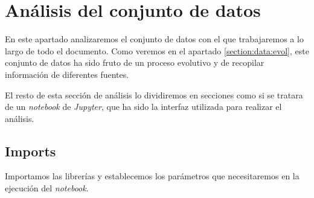 \section{Análisis del conjunto de datos}
\label{section:data:ana}
En este apartado analizaremos el conjunto de datos con el que trabajaremos a lo largo de todo el documento. Como veremos en el apartado \ref{section:data:evol}, este conjunto de datos ha sido fruto de un proceso evolutivo y de recopilar información de diferentes fuentes. 

El resto de esta sección de análisis lo dividiremos en secciones como si se tratara de un \textit{notebook} de \textit{Jupyter}, que ha sido la interfaz utilizada para realizar el análisis.


\subsection{Imports}

   Importamos las librerías y establecemos los parámetros que necesitaremos en la ejecución del \textit{notebook}.

\vspace{0.5cm}

